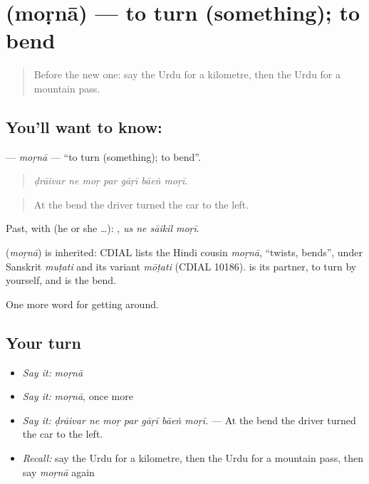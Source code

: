\section[\texorpdfstring{\ur{موڑنا} (moṛnā)}{موڑنا (moṛnā)}]{ (moṛnā) — to turn (something); to bend}

\label{lesson:UR-C397-morna}



\begin{quote}
Before the new one: say the Urdu for a kilometre, then the Urdu for a mountain pass.
\end{quote}

\subsection*{You'll want to know: }
\textbf{} — \emph{moṛnā} — \textquotedblleft{}to turn (something); to bend\textquotedblright{}.

\begin{quote}
      
\end{quote}

\begin{quote}
\emph{ḍrāivar ne moṛ par gāṛī bāeṅ moṛī.}
\end{quote}

\begin{quote}
At the bend the driver turned the car to the left.
\end{quote}

Past, with  (he or she …):    , \emph{us ne sāikil moṛī}.

\begin{cousinweb}
\textbf{} (\emph{moṛnā}) is inherited: CDIAL lists the Hindi cousin \emph{moṛnā}, \textquotedblleft{}twists, bends\textquotedblright{}, under Sanskrit \emph{muṭati} and its variant \emph{mōṭati} (CDIAL 10186). \textbf{} is its partner, to turn by yourself, and \textbf{} is the bend.
\end{cousinweb}

\begin{grammarlens}[title={What you've built}]
One more word for getting around.
\end{grammarlens}

\subsection*{Your turn}
\begin{itemize}
\raggedright
  \item \emph{Say it:} \emph{moṛnā}
  \item \emph{Say it:} \emph{moṛnā}, once more
  \item \emph{Say it:} \emph{ḍrāivar ne moṛ par gāṛī bāeṅ moṛī.} — At the bend the driver turned the car to the left.
  \item \emph{Recall:} say the Urdu for a kilometre, then the Urdu for a mountain pass, then say \emph{moṛnā} again
\end{itemize}

